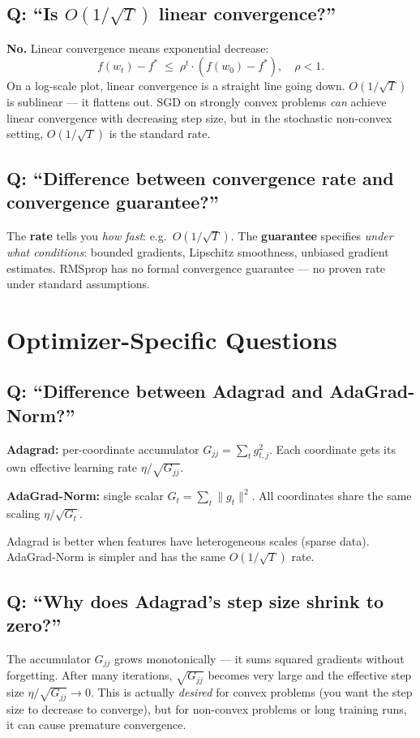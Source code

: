 \documentclass[10pt,a4paper]{article}
\begin{document}
\subsection{Q: ``Is $O(1/\sqrt{T})$ linear convergence?''}
\textbf{No.} Linear convergence means exponential decrease:
\[
  f(w_t) - f^* \;\leq\; \rho^t \cdot (f(w_0) - f^*), \quad \rho < 1.
\]
On a log-scale plot, linear convergence is a straight line going down.
$O(1/\sqrt{T})$ is sublinear --- it flattens out.
SGD on strongly convex problems \emph{can} achieve linear convergence with decreasing step size, but in the stochastic non-convex setting, $O(1/\sqrt{T})$ is the standard rate.

\subsection{Q: ``Difference between convergence rate and convergence guarantee?''}
The \textbf{rate} tells you \emph{how fast}: e.g.\ $O(1/\sqrt{T})$.
The \textbf{guarantee} specifies \emph{under what conditions}: bounded gradients, Lipschitz smoothness, unbiased gradient estimates.
RMSprop has no formal convergence guarantee --- no proven rate under standard assumptions.

\section{Optimizer-Specific Questions}

\subsection{Q: ``Difference between Adagrad and AdaGrad-Norm?''}
\textbf{Adagrad:} per-coordinate accumulator $G_{jj} = \sum_t g_{t,j}^2$.
Each coordinate gets its own effective learning rate $\eta / \sqrt{G_{jj}}$.

\textbf{AdaGrad-Norm:} single scalar $G_t = \sum_t \|g_t\|^2$.
All coordinates share the same scaling $\eta / \sqrt{G_t}$.

Adagrad is better when features have heterogeneous scales (sparse data).
AdaGrad-Norm is simpler and has the same $O(1/\sqrt{T})$ rate.

\subsection{Q: ``Why does Adagrad's step size shrink to zero?''}
The accumulator $G_{jj}$ grows monotonically --- it sums squared gradients without forgetting.
After many iterations, $\sqrt{G_{jj}}$ becomes very large and the effective step size $\eta/\sqrt{G_{jj}} \to 0$.
This is actually \emph{desired} for convex problems (you want the step size to decrease to converge), but for non-convex problems or long training runs, it can cause premature convergence.
\end{document}

